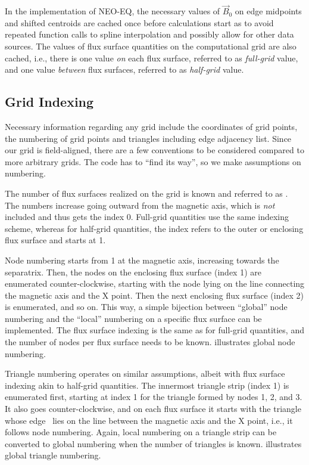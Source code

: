 In the implementation of NEO-EQ, the necessary values of $\vec{B}_{0}$ on edge midpoints and shifted centroids are cached once before calculations start as to avoid repeated function calls to spline interpolation and possibly allow for other data sources. The values of flux surface quantities on the computational grid are also cached, i.e., there is one value \emph{on} each flux surface, referred to as \emph{full-grid} value, and one value \emph{between} flux surfaces, referred to as \emph{half-grid} value.

\subsection{Grid Indexing}
\label{sec:grid-impl}

Necessary information regarding any grid include the coordinates of grid points, the numbering of grid points and triangles including edge adjacency list. Since our grid is field-aligned, there are a few conventions to be considered compared to more arbitrary grids. The code has to \enquote{find its way}, so we make assumptions on numbering.

The number of flux surfaces realized on the grid is known and referred to as \nflux. The numbers increase going outward from the magnetic axis, which is \emph{not} included and thus gets the index 0. Full-grid quantities use the same indexing scheme, whereas for half-grid quantities, the index refers to the outer or enclosing flux surface and starts at 1.

Node numbering starts from 1 at the magnetic axis, increasing towards the separatrix. Then, the nodes on the enclosing flux surface (index 1) are enumerated counter-clockwise, starting with the node lying on the line connecting the magnetic axis and the X point. Then the next enclosing flux surface (index 2) is enumerated, and so on. This way, a simple bijection between \enquote{global} node numbering and the \enquote{local} numbering on a specific flux surface can be implemented. The flux surface indexing is the same as for full-grid quantities, and the number of nodes per flux surface needs to be known.  illustrates global node numbering.

Triangle numbering operates on similar assumptions, albeit with flux surface indexing akin to half-grid quantities. The innermost triangle strip (index 1) is enumerated first, starting at index 1 for the triangle formed by nodes 1, 2, and 3. It also goes counter-clockwise, and on each flux surface it starts with the triangle whose edge \inw\ lies on the line between the magnetic axis and the X point, i.e., it follows node numbering. Again, local numbering on a triangle strip can be converted to global numbering when the number of triangles is known.  illustrates global triangle numbering.

